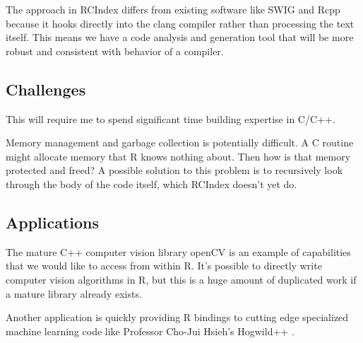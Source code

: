 \documentclass[12pt]{article}
\begin{document}
The approach in RCIndex differs from existing software like SWIG
\cite{swig} and Rcpp \cite{R-Rcpp} because it hooks directly into the clang
compiler rather than processing the text itself. This means we have a code
analysis and generation tool that will be more robust and consistent with
behavior of a compiler. 

\subsection{Challenges}

This will require me to spend significant time building expertise in C/C++.

Memory management and garbage collection is potentially difficult. A C
routine might allocate memory that R knows nothing about. Then how is that
memory protected and freed? A possible solution to this problem is to
recursively look
through the body of the code itself, which RCIndex doesn't yet do.

\subsection{Applications}

The mature C++ computer vision library openCV
\cite{opencv_library} is an example of capabilities that we would like to
access from within R. It's possible to directly write computer vision
algorithms in R, but this is a huge amount of duplicated work if a mature
library already exists.

Another application is quickly providing R bindings to cutting edge
specialized machine learning code like Professor Cho-Jui Hsieh's Hogwild++
\cite{zhang2016hogwild}.

\newpage

 
\end{document}
